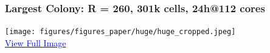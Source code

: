 \documentclass[10pt,t]{beamer}
\begin{document}






\begin{frame}
    \frametitle{Largest Colony: R = 260, 301k cells, 24h@112 cores}



    \begin{center}
        {\texttt{[image: figures/figures\_paper/huge/huge\_cropped.jpeg]}}\\[0.6em]
        \small
        \href{https://home.cit.tum.de/~ler/bacteria/videos/huge_high_quality.jpeg}{\textcolor{blue}{{View Full Image}}}
    \end{center}
\end{frame}
\end{document}
